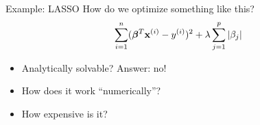 \documentclass[11pt,compress,t,notes=noshow, xcolor=table]{beamer}
\begin{document}
\begin{vbframe}{Example: LASSO}
 How do we optimize something like this?
  $$\sum_{i=1}^n (\bm{\beta}^T \mathbf{x}^{(i)} - y^{(i)})^2 + \lambda \sum_{j=1}^p |\beta_j|$$

  \begin{itemize}
    \item Analytically solvable? Answer: no!
    \item How does it work \enquote{numerically}?
    \item How expensive is it?
  \end{itemize}
\end{vbframe}



\endlecture
\end{document}
